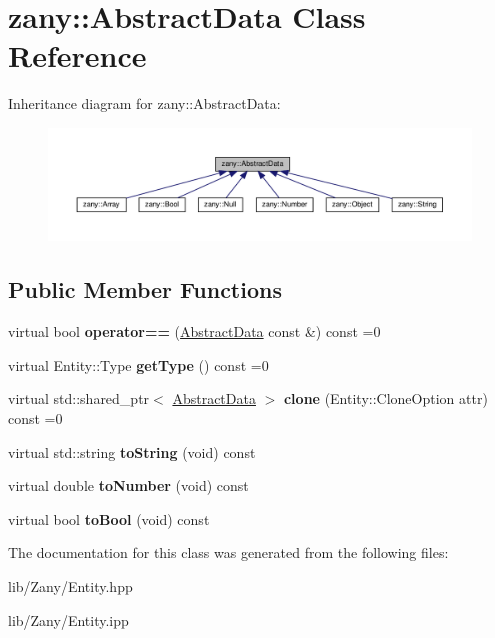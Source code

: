 \hypertarget{classzany_1_1_abstract_data}{}\section{zany\+:\+:Abstract\+Data Class Reference}
\label{classzany_1_1_abstract_data}


Inheritance diagram for zany\+:\+:Abstract\+Data\+:
\nopagebreak
\begin{figure}[H]
\begin{center}
\leavevmode
\includegraphics[width=350pt]{classzany_1_1_abstract_data__inherit__graph}
\end{center}
\end{figure}
\subsection*{Public Member Functions}
\begin{DoxyCompactItemize}
\item 
\mbox{\label{classzany_1_1_abstract_data_af588241c769203e4da39e7e65ba3827e}} 
virtual bool {\bfseries operator==} (\hyperlink{classzany_1_1_abstract_data}{Abstract\+Data} const \&) const =0
\item 
\mbox{\label{classzany_1_1_abstract_data_a4bb30d06e18fe51092f0521ce9bc19fe}} 
virtual Entity\+::\+Type {\bfseries get\+Type} () const =0
\item 
\mbox{\label{classzany_1_1_abstract_data_a7c704114ba15545d6f97916fccf8c89c}} 
virtual std\+::shared\+\_\+ptr$<$ \hyperlink{classzany_1_1_abstract_data}{Abstract\+Data} $>$ {\bfseries clone} (Entity\+::\+Clone\+Option attr) const =0
\item 
\mbox{\label{classzany_1_1_abstract_data_a53fb86c6d8c55de8f6a84ef84f8d162a}} 
virtual std\+::string {\bfseries to\+String} (void) const
\item 
\mbox{\label{classzany_1_1_abstract_data_a9b61e34d54318cc43338cf3a789c44c2}} 
virtual double {\bfseries to\+Number} (void) const
\item 
\mbox{\label{classzany_1_1_abstract_data_ad7b1545b514405a21d5c49e513bb700e}} 
virtual bool {\bfseries to\+Bool} (void) const
\end{DoxyCompactItemize}


The documentation for this class was generated from the following files\+:\begin{DoxyCompactItemize}
\item 
lib/\+Zany/Entity.\+hpp\item 
lib/\+Zany/Entity.\+ipp\end{DoxyCompactItemize}
